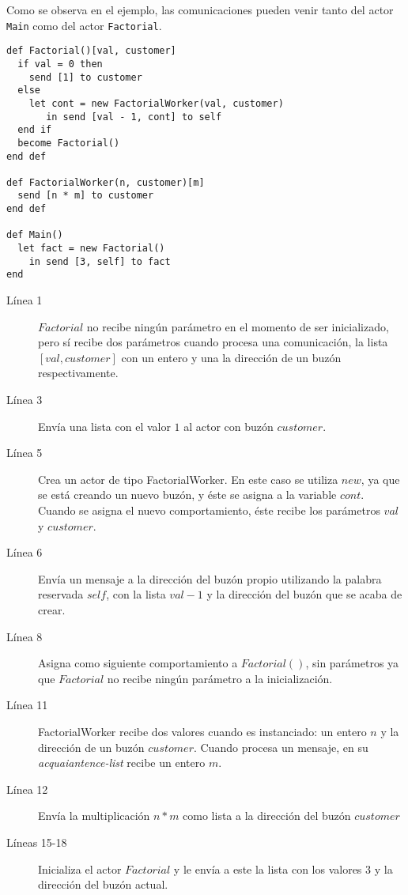 Como se observa en el ejemplo, las comunicaciones pueden venir tanto del actor \lstinline[language=sal, style=simple]$Main$ como del actor \lstinline[language=sal, style=simple]$Factorial$.

\begin{lstlisting}[language=sal, style=simple]
def Factorial()[val, customer]
  if val = 0 then
    send [1] to customer
  else
    let cont = new FactorialWorker(val, customer)
       in send [val - 1, cont] to self
  end if 
  become Factorial()
end def

def FactorialWorker(n, customer)[m] 
  send [n * m] to customer
end def

def Main() 
  let fact = new Factorial() 
    in send [3, self] to fact
end
\end{lstlisting}

\begin{description}

\item [Línea 1] $Factorial$ no recibe ningún parámetro en el momento de ser inicializado, pero sí recibe dos parámetros cuando procesa una comunicación, la lista $[val, customer]$ con un entero y una la dirección de un buzón respectivamente.
\item [Línea 3] Envía una lista con el valor $1$ al actor con buzón $customer$.
\item [Línea 5] Crea un actor de tipo FactorialWorker. En este caso se utiliza $new$, ya que se está creando un nuevo buzón, y éste se asigna a la variable $cont$. Cuando se asigna el nuevo comportamiento, éste recibe los parámetros $val$ y $customer$.
\item [Línea 6] Envía un mensaje a la dirección del buzón propio utilizando la palabra reservada $self$, con la lista $val - 1$ y la dirección del buzón que se acaba de crear.
\item [Línea 8] Asigna como siguiente comportamiento a $Factorial()$, sin parámetros ya que $Factorial$ no recibe ningún parámetro a la inicialización.  
\item [Línea 11] FactorialWorker recibe dos valores cuando es instanciado: un entero $n$ y la dirección de un buzón $customer$. Cuando procesa un mensaje, en su \textit{acquaiantence-list} recibe un entero $m$.
\item [Línea 12] Envía la multiplicación $n*m$ como lista a la dirección del buzón $customer$ 
\item [Líneas 15-18] Inicializa el actor $Factorial$ y le envía a este la lista con los valores $3$ y la dirección del buzón actual. 

\end{description}


